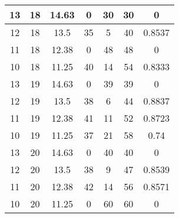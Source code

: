 \documentclass[letterpaper, 12pt]{article}
\begin{document}
\begin{longtable}{|c|c|c|c|c|c|c|}
\hline
13 & 18 & 14.63 & 0 & 30 & 30 & 0 \\
\hline
12 & 18 & 13.5 & 35 & 5 & 40 & 0.8537 \\
\hline
11 & 18 & 12.38 & 0 & 48 & 48 & 0 \\
\hline
10 & 18 & 11.25 & 40 & 14 & 54 & 0.8333 \\
\hline
13 & 19 & 14.63 & 0 & 39 & 39 & 0 \\
\hline
12 & 19 & 13.5 & 38 & 6 & 44 & 0.8837 \\
\hline
11 & 19 & 12.38 & 41 & 11 & 52 & 0.8723 \\
\hline
10 & 19 & 11.25 & 37 & 21 & 58 & 0.74 \\
\hline
13 & 20 & 14.63 & 0 & 40 & 40 & 0 \\
\hline
12 & 20 & 13.5 & 38 & 9 & 47 & 0.8539 \\
\hline
11 & 20 & 12.38 & 42 & 14 & 56 & 0.8571 \\
\hline
10 & 20 & 11.25 & 0 & 60 & 60 & 0 \\
\hline
\end{longtable}
\end{document}
